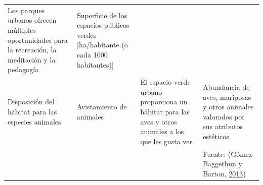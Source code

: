 \documentclass[12pt,a4paper,oneside, openany]{book}
\theoremstyle{definition}
\theoremstyle{definition}
\theoremstyle{definition}
\theoremstyle{remark}
\begin{document}
\begin{longtable}[]{@{}llll@{}}
\begin{minipage}[t]{0.19\columnwidth}
Los parques urbanos ofrecen múltiples oportunidades para la recreación,
la meditación y la pedagogía\strut
\end{minipage} & \begin{minipage}[t]{0.22\columnwidth}\raggedright\strut
Superficie de los espacios públicos verdes {[}ha/habitante (o cada 1000
habitantes){]}\strut
\end{minipage}\tabularnewline
\begin{minipage}[t]{0.26\columnwidth}\raggedright\strut
Disposición del hábitat para las especies animales\strut
\end{minipage} & \begin{minipage}[t]{0.22\columnwidth}\raggedright\strut
Avistamiento de animales\strut
\end{minipage} & \begin{minipage}[t]{0.19\columnwidth}\raggedright\strut
El espacio verde urbano proporciona un hábitat para las aves y otros
animales a los que les gusta ver\strut
\end{minipage} & \begin{minipage}[t]{0.22\columnwidth}\raggedright\strut
Abundancia de aves, mariposas y otros animales valorados por sus
atributos estéticos\strut
\end{minipage}\tabularnewline
\begin{minipage}[t]{0.26\columnwidth}\raggedright\strut
\strut
\end{minipage} & \begin{minipage}[t]{0.22\columnwidth}\raggedright\strut
\strut
\end{minipage} & \begin{minipage}[t]{0.19\columnwidth}\raggedright\strut
\strut
\end{minipage} & \begin{minipage}[t]{0.22\columnwidth}\raggedright\strut
Fuente: (Gómez-Baggethun y Barton,
\protect\hyperlink{ref-gomez-baggethun_classifying_2013}{2013})\strut
\end{minipage}\tabularnewline
\bottomrule
\end{longtable}
\end{document}
